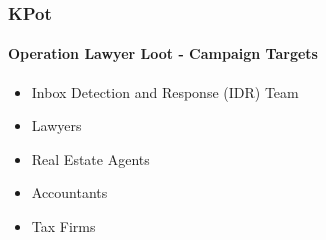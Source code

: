 \documentclass[aspectratio=169]{beamer}
\begin{document}
{%
\begin{frame}
  \frametitle{KPot}
  \framesubtitle{Operation Lawyer Loot - Campaign Targets}
  \begin{itemize}
    \item{Inbox Detection and Response (IDR)} Team
    \item{Lawyers}
    \item{Real Estate Agents}
    \item{Accountants}
    \item{Tax Firms}
  \end{itemize}
\end{frame}
}
\end{document}
